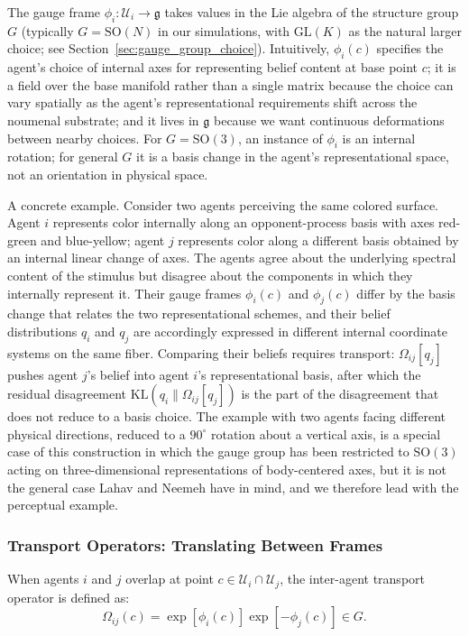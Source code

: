 \documentclass[11pt]{article}
\begin{document}
The gauge frame $\phi_i: \mathcal{U}_i \to \mathfrak{g}$ takes values in the Lie algebra of the structure group $G$ (typically $G = \mathrm{SO}(N)$ in our simulations, with $\mathrm{GL}(K)$ as the natural larger choice; see Section~\ref{sec:gauge_group_choice}). Intuitively, $\phi_i(c)$ specifies the agent's choice of internal axes for representing belief content at base point $c$; it is a field over the base manifold rather than a single matrix because the choice can vary spatially as the agent's representational requirements shift across the noumenal substrate; and it lives in $\mathfrak{g}$ because we want continuous deformations between nearby choices. For $G = \mathrm{SO}(3)$, an instance of $\phi_i$ is an internal rotation; for general $G$ it is a basis change in the agent's representational space, not an orientation in physical space.

A concrete example. Consider two agents perceiving the same colored surface. Agent $i$ represents color internally along an opponent-process basis with axes red-green and blue-yellow; agent $j$ represents color along a different basis obtained by an internal linear change of axes. The agents agree about the underlying spectral content of the stimulus but disagree about the components in which they internally represent it. Their gauge frames $\phi_i(c)$ and $\phi_j(c)$ differ by the basis change that relates the two representational schemes, and their belief distributions $q_i$ and $q_j$ are accordingly expressed in different internal coordinate systems on the same fiber. Comparing their beliefs requires transport: $\Omega_{ij}[q_j]$ pushes agent $j$'s belief into agent $i$'s representational basis, after which the residual disagreement $\mathrm{KL}(q_i \|  \Omega_{ij}[q_j])$ is the part of the disagreement that does not reduce to a basis choice. The example with two agents facing different physical directions, reduced to a $90^\circ$ rotation about a vertical axis, is a special case of this construction in which the gauge group has been restricted to $\mathrm{SO}(3)$ acting on three-dimensional representations of body-centered axes, but it is not the general case Lahav and Neemeh have in mind, and we therefore lead with the perceptual example.

\subsubsection{Transport Operators: Translating Between Frames}
\label{sec:transport}

When agents $i$ and $j$ overlap at point $c \in \mathcal{U}_i \cap \mathcal{U}_j$, the inter-agent transport operator is defined as:
\begin{equation}
\Omega_{ij}(c) = \exp[\phi_i(c)] \exp[-\phi_j(c)] \in G.
\label{eq:transport_def}
\end{equation}
\end{document}
